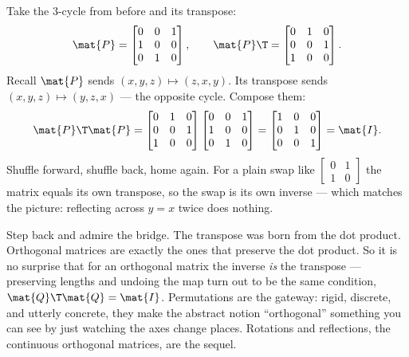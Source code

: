 \begin{example}\label{ch10:ex-cycle-inverse}
Take the $3$-cycle from before and its transpose:
\[
  \mat{P}=\begin{bmatrix} 0 & 0 & 1 \\ 1 & 0 & 0 \\ 0 & 1 & 0 \end{bmatrix},
  \qquad
  \mat{P}\T=\begin{bmatrix} 0 & 1 & 0 \\ 0 & 0 & 1 \\ 1 & 0 & 0 \end{bmatrix}.
\]
Recall $\mat{P}$ sends $(x,y,z)\mapsto(z,x,y)$. Its transpose sends $(x,y,z)\mapsto(y,z,x)$ --- the
opposite cycle. Compose them:
\[
  \mat{P}\T\mat{P}
  = \begin{bmatrix} 0 & 1 & 0 \\ 0 & 0 & 1 \\ 1 & 0 & 0 \end{bmatrix}
    \begin{bmatrix} 0 & 0 & 1 \\ 1 & 0 & 0 \\ 0 & 1 & 0 \end{bmatrix}
  = \begin{bmatrix} 1 & 0 & 0 \\ 0 & 1 & 0 \\ 0 & 0 & 1 \end{bmatrix} = \mat{I}.
\]
Shuffle forward, shuffle back, home again. For a plain swap like
$\left[\begin{smallmatrix}0&1\\1&0\end{smallmatrix}\right]$ the matrix equals its own transpose, so
the swap is its own inverse --- which matches the picture: reflecting across $y=x$ twice does nothing.
\end{example}

\begin{aestheticbox}
Step back and admire the bridge. The transpose was born from the dot product. Orthogonal matrices
are exactly the ones that preserve the dot product. So it is no surprise that for an orthogonal
matrix the inverse \emph{is} the transpose --- preserving lengths and undoing the map turn out to be
the same condition, $\mat{Q}\T\mat{Q}=\mat{I}$. Permutations are the gateway: rigid, discrete, and
utterly concrete, they make the abstract notion ``orthogonal'' something you can see by just watching
the axes change places. Rotations and reflections, the continuous orthogonal matrices, are the
sequel.
\end{aestheticbox}

